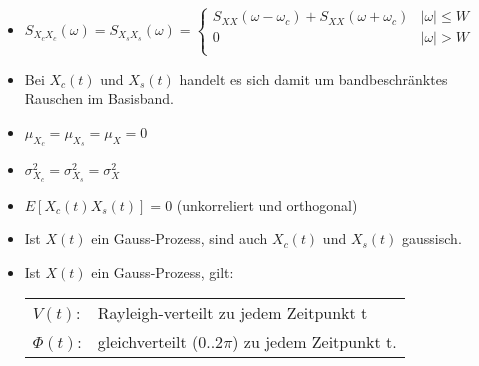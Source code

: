 \documentclass[10pt, a4paper]{article}
\begin{document}
\begin{itemize}
\item $S_{X_{c}X_{c}}(\omega) = S_{X_{s}X_{s}}(\omega)
                   = \left\lbrace
                       \begin{array}{ll}
                         S_{XX}(\omega -\omega_{c}) +S_{XX}(\omega +\omega_{c})
                                        & \mid\!\omega\!\mid \leq W \\
                         0              & \mid\!\omega\!\mid > W \\
                       \end{array} \right. $ \\ 
  \item Bei $X_{c}(t)$ und $X_{s}(t)$ handelt es sich damit um bandbeschr\"anktes Rauschen im Basisband.
  \item $\mu_{X_{c}} = \mu_{X_{s}} = \mu_{X} = 0$ 
  \item $\sigma^{2}_{X_{c}} = \sigma^{2}_{X_{s}} = \sigma^{2}_{X}$
  \item $E\left[ X_{c}(t)X_{s}(t) \right]  = 0$ \hspace{20pt} (unkorreliert und orthogonal)
  \item Ist $X(t)$ ein Gauss-Prozess, sind auch $X_{c}(t)$ und $X_{s}(t)$ gaussisch.
  \item Ist $X(t)$ ein Gauss-Prozess, gilt: \\
        \begin{tabular}{ll}
        $V(t)$: & Rayleigh-verteilt zu jedem Zeitpunkt t \\
        $\Phi(t)$: & gleichverteilt ($0..2\pi$) zu jedem Zeitpunkt t. \\
        \end{tabular} \\
\end{itemize} 
\end{document}
